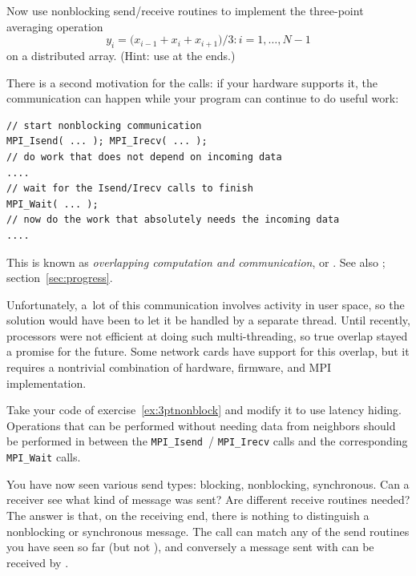 \begin{exercise}
  \label{ex:3ptnonblock}
  Now use nonblocking send/receive routines to implement
  the three-point averaging operation
  \[ y_i=\bigl( x_{i-1}+x_i+x_{i+1} \bigr)/3\colon i=1,\ldots,N-1 \]
  on a distributed array. (Hint: use  at the ends.)
\end{exercise}

There is a second motivation for the  calls:
if your hardware supports it, the communication can
happen
while your program can continue to do useful work:
\begin{lstlisting}
// start nonblocking communication
MPI_Isend( ... ); MPI_Irecv( ... );
// do work that does not depend on incoming data
....
// wait for the Isend/Irecv calls to finish
MPI_Wait( ... );
// now do the work that absolutely needs the incoming data
....
\end{lstlisting}
This is known as \emph{overlapping computation and communication}, or
%
.
See also ; section~\ref{sec:progress}.

Unfortunately, a~lot of this
communication involves activity in user space, so the solution would
have been to let it be handled by a separate thread. Until recently,
processors were not efficient at doing such multi-threading, so true
overlap stayed a promise for the future. Some network cards have
support for this overlap, but it requires a nontrivial combination of
hardware, firmware, and MPI implementation.

\begin{exercise}
  \label{ex:3ptnonblock-hide}
  Take your code of exercise~\ref{ex:3ptnonblock} and modify it to use
  latency hiding. Operations that can be performed without needing
  data from neighbors should be performed in between the
  \lstinline{MPI_Isend}~/ \lstinline{MPI_Irecv} calls and the
  corresponding \lstinline{MPI_Wait} calls.
\end{exercise}

\begin{remark}
  You have now seen various send types: blocking, nonblocking, synchronous.
  Can a receiver see what kind of message was sent? Are different receive
  routines needed?
  The answer is that, on the receiving end, there is nothing to distinguish
  a nonblocking or
  synchronous message. The  call can match any of the
  send routines you have seen so far (but not ), and
  conversely a message sent with 
  can be received by .
\end{remark}

